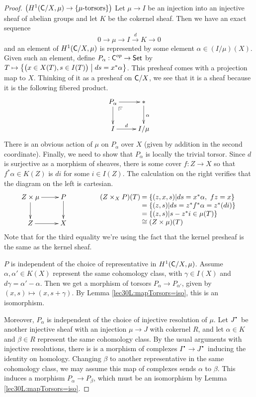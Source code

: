 \begin{proof}
 $\bigl(H^1(\text{\sf C}/X,\mu)\to \{\mu\text{-torsors}\}\bigr)$ Let $\mu\to I$ be an injection into an injective sheaf of abelian groups and let $K$ be the cokernel sheaf. Then we have an exact sequence
 \[
  0\to \mu\to I\xrightarrow d K\to 0
 \]
 and an element of $H^1(\text{\sf C}/X,\mu)$ is represented by some element $\alpha\in (I/\mu)(X)$. Given such an element, define $P_\alpha:\text{\sf C}^{op}\to \text{\sf Set}$ by $T\mapsto \bigl\{\bigl(x\in X(T),s\in I(T)\bigr)\bigm| ds=x^*\alpha \bigr\}$. This presheaf comes with a projection map to $X$. Thinking of it as a presheaf on $\text{\sf C}/X$, we see that it is a sheaf because it is the following fibered product.
 \[\xymatrix{
  P_\alpha\ar[r]\ar[d]\ar@{}[dr]|(.25)\pb & \ast\ar[d]^{\alpha}\\
  I\ar[r]^<>(.5)d & I/\mu
 }\]
 There is an obvious action of $\mu$ on $P_\alpha$ over $X$ (given by addition in the second coordinate). Finally, we need to show that $P_\alpha$ is locally the trivial torsor. Since $d$ is surjective as a morphism of sheaves, there is some cover $f:Z\to X$ so that $f^*\alpha\in K(Z)$ is $di$ for some $i\in I(Z)$. The calculation on the right verifies that the diagram on the left is cartesian.
 \[\xymatrix{
   Z\times \mu \ar[d]\ar[r] & P\ar[d]\\
   Z\ar[r] & X
 }\qquad\qquad\begin{array}[t]{r@{\:}l}
   (Z\times_X P)(T) &= \{(z,x,s)|ds=x^*\alpha,\ fz=x\}\\
   &= \{(z,s)|ds=z^*f^*\alpha=z^*(di)\}\\
   &= \{(z,s)|s-z^*i\in \mu(T)\}\\
   &\cong (Z\times\mu)(T)
  \end{array}\]
 Note that for the third equality we're using the fact that the kernel presheaf is the same as the kernel sheaf.

 $P$ is independent of the choice of representative in $H^1(\text{\sf C}/X,\mu)$. Assume $\alpha,\alpha'\in K(X)$ represent the same cohomology class, with $\gamma\in I(X)$ and $d\gamma=\alpha'-\alpha$. Then we get a morphism of torsors $P_\alpha\to P_{\alpha'}$, given by $(x,s)\mapsto (x,s+\gamma)$. By Lemma \ref{lec30L:mapTorsors=iso}, this is an isomorphism.

 Moreover, $P_\alpha$ is independent of the choice of injective resolution of $\mu$. Let $J^\udot$ be another injective sheaf with an injection $\mu\to J$ with cokernel $R$, and let $\alpha\in K$ and $\beta\in R$ represent the same cohomology class. By the usual arguments with injective resolutions, there is is a morphism of complexes $I^\udot\to J^\udot$ inducing the identity on homology. Changing $\beta$ to another representative in the same cohomology class, we may assume this map of complexes sends $\alpha$ to $\beta$. This induces a morphism $P_\alpha\to P_\beta$, which must be an isomorphism by Lemma \ref{lec30L:mapTorsors=iso}.


\end{proof}
